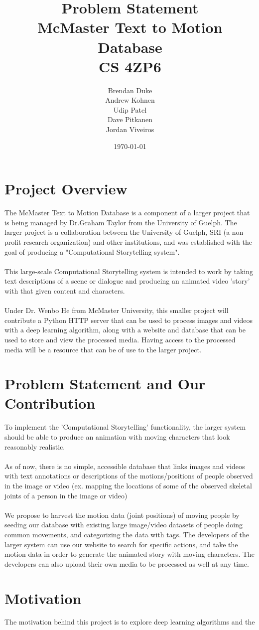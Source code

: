 \documentclass[a4paper, 12pt]{article}
\date{\today}
\title{Problem Statement\\ McMaster Text to Motion Database \\CS 4ZP6}
\author{Brendan Duke\\
        Andrew Kohnen\\
        Udip Patel\\
        Dave Pitkanen\\
        Jordan Viveiros}
\begin{document}
\maketitle
\clearpage

\section{Project Overview}

The McMaster Text to Motion Database is a component of a larger project that is being managed by Dr.Graham Taylor from the University of Guelph. The larger project is a collaboration between the University of Guelph, SRI (a non-profit research organization) and other institutions, and was established with the goal of producing a "Computational Storytelling system".
\\
\\
This large-scale Computational Storytelling system is intended to work by taking text descriptions of a scene or dialogue and producing an animated video 'story' with that given content and characters.
\\
\\
Under Dr. Wenbo He from McMaster University, this smaller project will contribute a Python HTTP server that can be used to process images and videos with a deep learning algorithm, along with a website and database that can be used to store and view the processed media. Having access to the processed media will be a resource that can be of use to the larger project.


\section{Problem Statement and Our Contribution}
To implement the 'Computational Storytelling' functionality, the larger system should be able to produce an animation with moving characters that look reasonably realistic.
\\
\\
As of now, there is no simple, accessible database that links images and videos with text annotations or descriptions of the motions/positions of people observed in the image or video (ex. mapping the locations of some of the observed skeletal joints of a person in the image or video)
\\
\\
We propose to harvest the motion data (joint positions) of moving people by seeding our database with existing large image/video datasets of people doing common movements, and categorizing the data with tags. The developers of the larger system can use our website to search for specific actions, and take the motion data in order to generate the animated story with moving characters. The developers can also upload their own media to be processed as well at any time.




\section{Motivation}
The motivation behind this project is to explore deep learning algorithms and the
\end{document}
